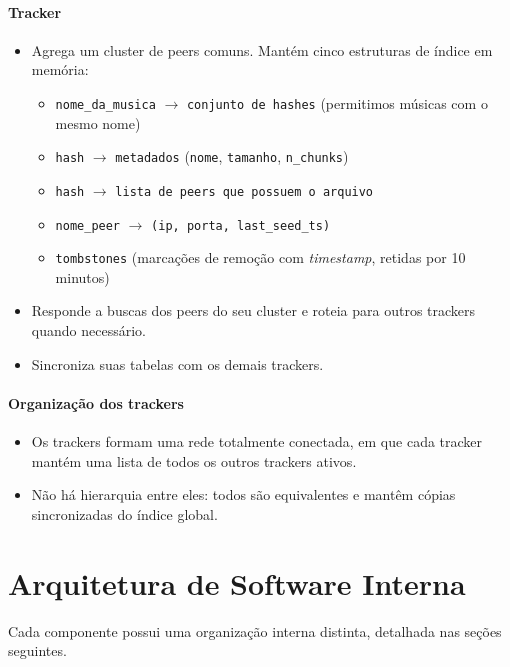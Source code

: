 \documentclass[12pt, a4paper]{article}
\begin{document}
\paragraph{Tracker}
\begin{itemize}
    \item Agrega um cluster de peers comuns. Mantém cinco estruturas de índice em memória:
    \begin{itemize}
        \item \texttt{nome\_da\_musica} $\rightarrow$ \texttt{conjunto de hashes} (permitimos músicas com o mesmo nome)
        \item \texttt{hash} $\rightarrow$ \texttt{metadados} (\texttt{nome}, \texttt{tamanho}, \texttt{n\_chunks})
        \item \texttt{hash} $\rightarrow$ \texttt{lista de peers que possuem o arquivo}
        \item \texttt{nome\_peer} $\rightarrow$ \texttt{(ip, porta, last\_seed\_ts)}
        \item \texttt{tombstones} (marcações de remoção com \textit{timestamp}, retidas por 10 minutos)
    \end{itemize}
    \item Responde a buscas dos peers do seu cluster e roteia para outros trackers quando necessário.
    \item Sincroniza suas tabelas com os demais trackers.
\end{itemize}

\paragraph{Organização dos trackers}
\begin{itemize}
    \item Os trackers formam uma rede totalmente conectada, em que cada tracker mantém uma lista de todos os outros trackers ativos.
    \item  Não há hierarquia entre eles: todos são equivalentes e mantêm cópias sincronizadas do índice global.
\end{itemize}

\section{Arquitetura de Software Interna}\label{sec:arq-interna}

Cada componente possui uma organização interna distinta, detalhada nas seções seguintes.
\end{document}
